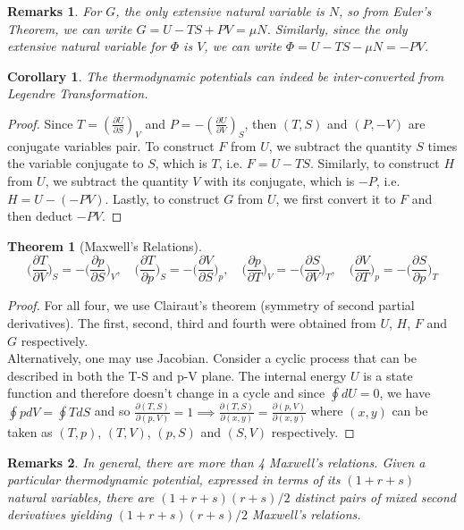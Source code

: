 \documentclass[a4paper]{article}
\newtheorem{remarks}{Remarks}[section]
\theoremstyle{new}
\newtheorem{thm}{Theorem}[section]
\newtheorem{cor}{Corollary}[section]
\begin{document}
\begin{remarks}
For $G$, the only extensive natural variable is $N$, so from Euler's Theorem, we can write $G=U-TS+PV=\mu N$. Similarly, since the only extensive natural variable for $\Phi$ is $V$, we can write $\Phi=U-TS-\mu N=-PV$.
\end{remarks}
\begin{cor}
The thermodynamic potentials can indeed be inter-converted from Legendre Transformation.
\end{cor}
\begin{proof}
Since $T=(\frac{\partial U}{\partial S})_V$ and $P=-(\frac{\partial U}{\partial V})_S$, then $(T,S)$ and $(P,-V)$ are conjugate variables pair. To construct $F$ from $U$, we subtract the quantity $S$ times the variable conjugate to $S$, which is $T$, i.e. $F=U-TS$. Similarly, to construct $H$ from $U$, we subtract the quantity $V$ with its conjugate, which is $-P$, i.e. $H=U-(-PV)$. Lastly, to construct $G$ from $U$, we first convert it to $F$ and then deduct $-PV$. 
\end{proof}
\begin{thm}[Maxwell's Relations]
\begin{equation}
\bigg(\frac{\partial T}{\partial V}\bigg)_S=-\bigg(\frac{\partial p}{\partial S}\bigg)_V,\quad\bigg(\frac{\partial T}{\partial p}\bigg)_S=-\bigg(\frac{\partial V}{\partial S}\bigg)_p,\quad\bigg(\frac{\partial p}{\partial T}\bigg)_V=-\bigg(\frac{\partial S}{\partial V}\bigg)_T,\quad\bigg(\frac{\partial V}{\partial T}\bigg)_p=-\bigg(\frac{\partial S}{\partial p}\bigg)_T\label{Maxwell}
\end{equation}
\end{thm}
\begin{proof}
For all four, we use Clairaut's theorem (symmetry of second partial derivatives). The first, second, third and fourth were obtained from $U$, $H$, $F$ and $G$ respectively.\\[5pt]
Alternatively, one may use Jacobian. Consider a cyclic process that can be described in both the T-S and p-V plane. The internal energy $U$ is a state function and therefore doesn't change in a cycle and since $\oint dU=0$, we have $\oint pdV=\oint TdS$ and so $\frac{\partial(T,S)}{\partial(p,V)}=1\implies\frac{\partial(T,S)}{\partial(x,y)}=\frac{\partial(p,V)}{\partial(x,y)}$ where $(x,y)$ can be taken as $(T,p)$, $(T,V)$, $(p,S)$ and $(S,V)$ respectively.
\end{proof}
\begin{remarks}
In general, there are more than 4 Maxwell's relations. Given a particular thermodynamic potential, expressed in terms of its $(1+r+s)$ natural variables, there are $(1+r+s)(r+s)/2$ distinct pairs of mixed second derivatives yielding $(1 + r + s)(r + s)/2$ Maxwell’s relations.
\end{remarks}
\end{document}
